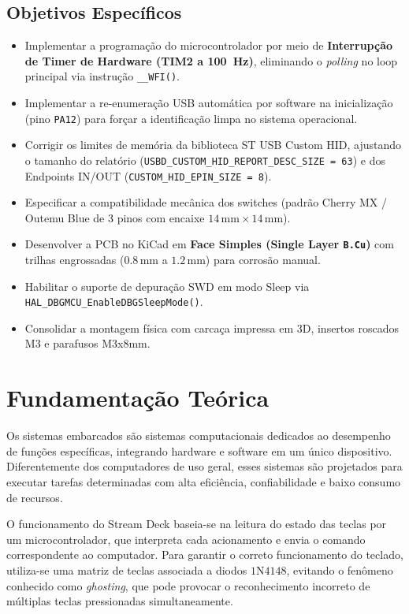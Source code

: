 \documentclass[12pt, a4paper]{article}
\begin{document}
\subsection{Objetivos Específicos}
\begin{itemize}
    \item Implementar a programação do microcontrolador por meio de \textbf{Interrupção de Timer de Hardware (TIM2 a 100~Hz)}, eliminando o \textit{polling} no loop principal via instrução \texttt{\_\_WFI()}.
    \item Implementar a re-enumeração USB automática por software na inicialização (pino \texttt{PA12}) para forçar a identificação limpa no sistema operacional.
    \item Corrigir os limites de memória da biblioteca ST USB Custom HID, ajustando o tamanho do relatório (\texttt{USBD\_CUSTOM\_HID\_REPORT\_DESC\_SIZE = 63}) e dos Endpoints IN/OUT (\texttt{CUSTOM\_HID\_EPIN\_SIZE = 8}).
    \item Especificar a compatibilidade mecânica dos switches (padrão Cherry MX / Outemu Blue de 3 pinos com encaixe $14\,\text{mm} \times 14\,\text{mm}$).
    \item Desenvolver a PCB no KiCad em \textbf{Face Simples (Single Layer \texttt{B.Cu})} com trilhas engrossadas ($0.8\,\text{mm}$ a $1.2\,\text{mm}$) para corrosão manual.
    \item Habilitar o suporte de depuração SWD em modo Sleep via \texttt{HAL\_DBGMCU\_EnableDBGSleepMode()}.
    \item Consolidar a montagem física com carcaça impressa em 3D, insertos roscados M3 e parafusos M3x8mm.
\end{itemize}

\section{Fundamentação Teórica}
\hspace*{1.25cm}Os sistemas embarcados são sistemas computacionais dedicados ao desempenho de funções específicas, integrando hardware e software em um único dispositivo. Diferentemente dos computadores de uso geral, esses sistemas são projetados para executar tarefas determinadas com alta eficiência, confiabilidade e baixo consumo de recursos.

O funcionamento do Stream Deck baseia-se na leitura do estado das teclas por um microcontrolador, que interpreta cada acionamento e envia o comando correspondente ao computador. Para garantir o correto funcionamento do teclado, utiliza-se uma matriz de teclas associada a diodos $1\text{N}4148$, evitando o fenômeno conhecido como \textit{ghosting}, que pode provocar o reconhecimento incorreto de múltiplas teclas pressionadas simultaneamente.
\end{document}
